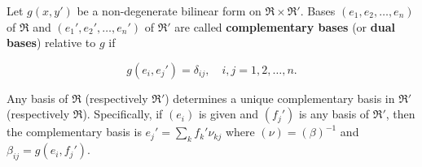 Let $g(x, y')$ be a non-degenerate bilinear form on $\mathfrak{R} \times \mathfrak{R}'$. Bases $(e_1, e_2, \dots, e_n)$ of $\mathfrak{R}$ and $(e_1', e_2', \dots, e_n')$ of $\mathfrak{R}'$ are called \textbf{complementary bases} (or \textbf{dual bases}) relative to $g$ if

$$g(e_i, e_j') = \delta_{ij}, \quad i, j = 1, 2, \dots, n.$$

Any basis of $\mathfrak{R}$ (respectively $\mathfrak{R}'$) determines a unique complementary basis in $\mathfrak{R}'$ (respectively $\mathfrak{R}$). Specifically, if $(e_i)$ is given and $(f_j')$ is any basis of $\mathfrak{R}'$, then the complementary basis is $e_j' = \sum_k f_k' \nu_{kj}$ where $(\nu) = (\beta)^{-1}$ and $\beta_{ij} = g(e_i, f_j')$.
